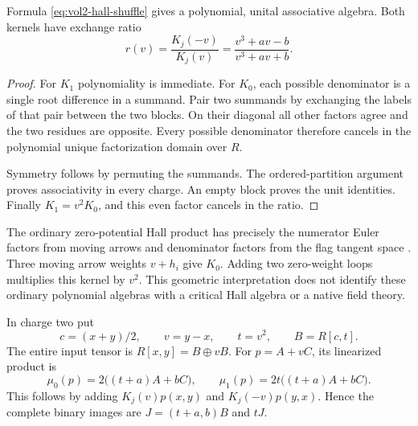 \begin{proposition}\label{prop:vol2-polynomial-shuffles}
Formula \eqref{eq:vol2-hall-shuffle} gives a polynomial,
unital associative algebra.
Both kernels have exchange ratio
\[
 r(v)=\frac{K_j(-v)}{K_j(v)}
     =\frac{v^3+av-b}{v^3+av+b}.
\]
\end{proposition}
\begin{proof}
For $K_1$ polynomiality is immediate.
For $K_0$, each possible denominator is a single root difference
in a summand.
Pair two summands by exchanging the labels of that pair between
the two blocks.
On their diagonal all other factors agree and the two residues
are opposite.
Every possible denominator therefore cancels in the polynomial
unique factorization domain over $R$.

Symmetry follows by permuting the summands.
The ordered-partition argument proves associativity in every charge.
An empty block proves the unit identities.
Finally $K_1=v^2K_0$, and this even factor cancels in the ratio.
\end{proof}

The ordinary zero-potential Hall product has precisely the
numerator Euler factors from moving arrows and denominator factors
from the flag tangent space \cite[Section~2.4, Theorem~2]{KSCoHA2011}.
Three moving arrow weights $v+h_i$ give $K_0$.
Adding two zero-weight loops multiplies this kernel by $v^2$.
This geometric interpretation does not identify these ordinary
polynomial algebras with a critical Hall algebra or a native field
theory.

In charge two put
\[
 c=(x+y)/2,\qquad v=y-x,\qquad t=v^2,\qquad B=R[c,t].
\]
The entire input tensor is $R[x,y]=B\oplus vB$.
For $p=A+vC$, its linearized product is
\begin{equation}\label{eq:vol2-hall-binary}
 \mu_0(p)=2\bigl((t+a)A+bC\bigr),\qquad
 \mu_1(p)=2t\bigl((t+a)A+bC\bigr).
\end{equation}
This follows by adding $K_j(v)p(x,y)$ and
$K_j(-v)p(y,x)$.
Hence the complete binary images are
$J=(t+a,b)B$ and $tJ$.

